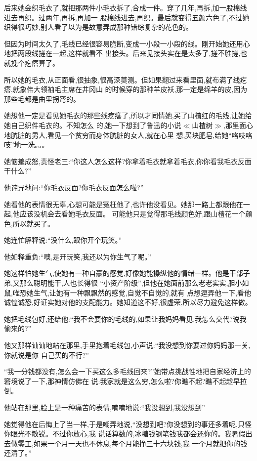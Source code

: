 ﻿\documentclass[12pt]{article}
\begin{document}
后来她会织毛衣了,就把那两件小毛衣拆了,合成一件。穿了几年,再拆,加一股棉线进去再织。过两年,再拆,再加一
股棉线进去,再织。最后就变得五颜六色了,不过她织得很巧妙,别人看了以为是故意弄成那种错综复杂的花色的。

但因为时间太久了,毛线已经很容易脆断,变成一小段一小段的线。刚开始她还用心地把两段线搓在一起,这样就看不
出接头。后来见接头实在是太多了,搓不胜搓,也就挽个疙瘩算了。

所以她的毛衣,从正面看,很抽象,很高深莫测。但如果翻过来看里面,就布满了线疙瘩,就象伟大领袖毛主席在井冈山
的时候穿的那种羊皮袄,那一定是绵羊的皮,因为那些毛都是曲里拐弯的。

她想他一定是看见她毛衣的那些线疙瘩了,所以才同情她,买了山楂红的毛线,让她给她自己织件毛衣的。不知怎么
的,她一下想到了鲁迅的小说$\ll$山楂树$\gg$,那里面心地肮脏的男人,看见一个贫穷而身体肮脏的女人,就在心里
想,买块肥皂,给她``咯吱咯吱''地一洗。。。

她恼羞成怒,责怪老三:``你这人怎么这样?你拿着毛衣就拿着毛衣,你\myrule 你看我毛衣反面干什么?''

他诧异地问:``你毛衣反面?你毛衣反面怎么啦?''

她看他的表情很无辜,心想可能是冤枉他了,也许他没看见。她那一路上都跟他在一起,他应该没机会去看她毛衣反面。
可能他只是觉得那毛线颜色好,跟山楂花一个颜色,所以就买了。

她连忙解释说:``没什么,跟你开个玩笑。''

他如释重负:``噢,是开玩笑,我还以为你生气了呢。''

她这样怕她生气,使她有一种自豪的感觉,好像她能操纵他的情绪一样。他是干部子弟,又那么聪明能干,人也长得很
``小资产阶级'',但他在她面前那么老老实实,胆小如鼠,唯恐她生气,让她有一种飘飘然的感觉,自觉不自觉的,就有
点想逗弄他一下,看他诚惶诚恐,好证实她对他的支配能力。她知道这不好,很虚荣,所以尽力避免这样做。

她把毛线包好,还给他:``我不会要你的毛线的,如果让我妈妈看见,我怎么交代?说我偷来的?''

他又那样讪讪地站在那里,手里抱着毛线包,小声说:``我没\myrule 想到你要过你妈妈那一关\myrule ,你就说是你
自己买的不行?''

``我一分钱都没有,怎么会一下买这么多毛线回来?''她带点挑战性地把自家经济上的窘境说了一下,那神情仿佛在
说:我家就是这么穷,怎么啦?你瞧不起?瞧不起趁早拉倒。

他站在那里,脸上是一种痛苦的表情,喃喃地说:``我没想到\myrule ,我没想到\myrule ''

她觉得他在后悔上了当一样,于是嘲弄地说,``没想到吧?你没想到的事还多着呢,只怪你眼光不敏锐。不过你放心,我
说话算数的,冰糖钱钢笔钱我都会还你的。我暑假出去做零工,如果一个月一天也不休息,每个月能挣三十六块钱,我
一个月就把你的钱还清了。''
\end{document}
